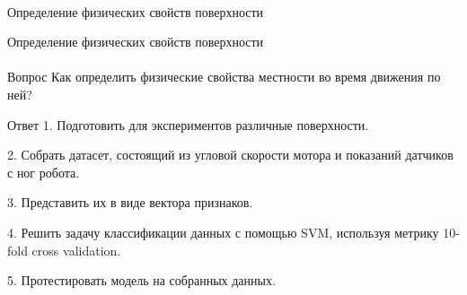 \documentclass[aspectratio=169,xcolor=table]{beamer}
\begin{document}
\begin{frame}[c]{}
    \framesubtitle{}
    \centering\LARGE Определение физических свойств поверхности
\end{frame}

\begin{frame}[t]{Определение физических свойств поверхности}
    \framesubtitle{}
    \vspace{-0.3cm}
    {\large\begin{block}{Вопрос}
            Как определить физические свойства местности во время движения по ней?
        \end{block}}
    {\large\begin{alertblock}{Ответ}
            1. Подготовить для экспериментов различные поверхности.

            2. Собрать датасет, состоящий из угловой скорости мотора и показаний датчиков с ног робота.

            3. Представить их в виде вектора признаков.

            4. Решить задачу классификации данных с помощью SVM, используя метрику 10-fold cross validation.

            5. Протестировать модель на собранных данных.
        \end{alertblock}}
\end{frame}
\end{document}
